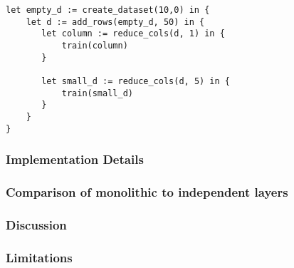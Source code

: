\begin{center}
\begin{minipage}{0.5\textwidth}
\begin{lstlisting}[caption={Caption that uses both rows and columns},label={lst:uc2_code3}]
let empty_d := create_dataset(10,0) in {
    let d := add_rows(empty_d, 50) in {
       let column := reduce_cols(d, 1) in {
           train(column)
       }

       let small_d := reduce_cols(d, 5) in {
           train(small_d)
       }
    }
}		
\end{lstlisting}
\end{minipage}
\end{center}
\subsubsection{Implementation Details}
\label{sssec:uc2_implementation}

\subsubsection{Comparison of monolithic to independent layers}
\label{sssec:uc2_comparison}

\subsubsection{Discussion}
\label{sssec:uc2_discussion}

\subsubsection{Limitations}
\label{sssec:uc2_limitations}
